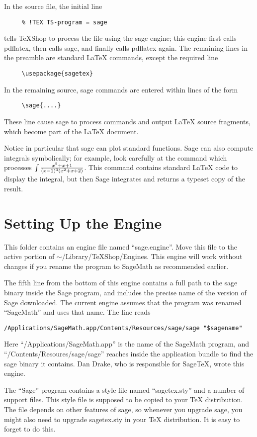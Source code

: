 \documentclass[11pt, oneside]{amsart}
\begin{document}
 In the source file, the initial line
\begin{verbatim}
     % !TEX TS-program = sage
\end{verbatim}
tells TeXShop to process the file using the sage engine; this engine first calls pdflatex, then calls sage, and finally calls pdflatex again.
The remaining lines in the preamble are standard LaTeX commands, except the required line
\begin{verbatim}
     \usepackage{sagetex}
\end{verbatim}
In the remaining source, sage commands are entered within lines of the form
\begin{verbatim}
     \sage{....}
\end{verbatim}
These line cause sage to process commands and output LaTeX source fragments, which become part of the LaTeX document.

Notice in particular that sage can plot standard functions. Sage can also compute integrals symbolically; for example, look carefully at the command which processes $\int {{x^2 + x + 1} \over {(x - 1)^3 (x^2 + x + 2)}}$. This command contains standard LaTeX code to display the integral, but then Sage integrates and returns a typeset copy of the result.


\section{Setting Up the Engine}

This folder contains an engine file named ``sage.engine''. Move this file to the active portion of $\sim$/Library/TeXShop/Engines. This engine will work without changes if you rename the program to SageMath as recommended earlier.

 The fifth line from the bottom of this engine contains a full path to the sage binary inside the Sage program, and includes the precise name of the version of Sage downloaded. The current engine assumes that the program was renamed ``SageMath'' and uses that name.  The line reads
\begin{verbatim}
/Applications/SageMath.app/Contents/Resources/sage/sage "$sagename"
\end{verbatim}
Here ``/Applications/SageMath.app'' is the name of the SageMath program,
and ``/Contents/Resoures/sage/sage'' reaches inside the application bundle to find the
sage binary it contains.
Dan Drake, who is responsible for SageTeX, wrote this engine.

The ``Sage'' program contains a style file named ``sagetex.sty'' and a number of support files. This style file is supposed to be copied to your TeX distribution. The file depends on other features of sage, so whenever you upgrade sage, you might also need to upgrade sagetex.sty in your TeX distribution. It is easy to forget to do this.
\end{document}
